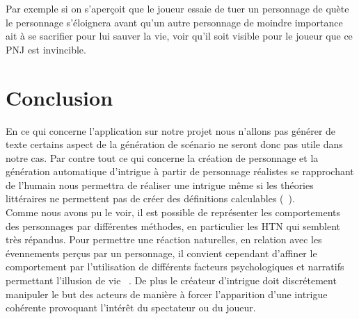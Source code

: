 \documentclass[asi]{picINSA}
\begin{document}
Par exemple si on s'aperçoit que le joueur essaie de tuer un personnage de quète le personnage s'éloignera avant qu'un autre 
personnage de moindre importance ait à se sacrifier pour lui sauver la vie, voir qu'il soit visible pour le joueur que ce PNJ est invincible. \\

\chapter*{Conclusion}

En ce qui concerne l'application sur notre projet nous n'allons pas générer de texte certains aspect de la génération de 
scénario ne seront donc pas utile dans notre cas. Par contre tout ce qui concerne la création de personnage et la
 génération automatique d'intrigue à partir de personnage réalistes se rapprochant de l'humain nous permettra de
  réaliser une intrigue même si les théories littéraires ne permettent pas de créer des définitions calculables (~\cite{Callaway2002213}). \\

Comme nous avons pu le voir, il est possible de représenter les comportements des personnages par différentes méthodes,
 en particulier les HTN qui semblent très répandus. Pour permettre une réaction naturelles, en relation avec 
 les évennements perçus par un personnage, il convient cependant d'affiner le comportement par l'utilisation de 
 différents facteurs psychologiques et narratifs permettant l'illusion de vie ~\cite{Bates94therole}. 
 De plus le créateur d'intrigue doit discrétement manipuler le but des acteurs de manière à forcer l'apparition d'une 
 intrigue cohérente provoquant l'intérêt du spectateur ou du joueur.

{}

\end{document}
